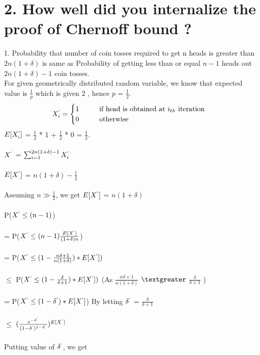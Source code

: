 \documentclass{article}
\begin{document}
\section*{2. How well did you internalize the proof of Chernoff bound ?} 
1. Probability that number of coin tosses required to get n heads is greater than $2n(1 + \delta)$ is same as Probability of getting less than or equal $n-1$ heads out $2n(1 + \delta) - 1$ coin tosses. \\ 
For given geometrically distributed random variable, we know that expected value is $\frac{1}{p}$ which is given $2$ , hence $p$ = $\frac{1}{2}$. \\
\[
	X_i^{`} =\begin{cases}
		1  \hspace{1cm}   $if head is obtained at $i_{th}$ iteration$ \\
		0  \hspace{1cm}   $otherwise$ 
		\end{cases}
\] %
$E[X_i^{`}]$ = $\frac{1}{2}$ * 1 + $\frac{1}{2}$ * 0 = $\frac{1}{2}$. \\\\
$X^{`}$ = $\sum_{i=1}^{2n(1 + \delta) - 1}X_i^{`}$ \\\\
$E[X^{`}]$ = $n(1+\delta) - \frac{1}{2}$ \\\\
Assuming $n \gg \frac{1}{2}$, we get $E[X^{`}]$ =  $n(1+\delta) $ \\\\
P($X^{`} \leq (n-1)$) \\\\
= P($X^{`} \leq (n-1)\frac{E[X^{`}]}{(1 + \delta)n}$)\\\\
= P($X^{`} \leq (1 - \frac{n\delta+1}{n(1+\delta)})*E[X^{`}])$ \\\\
$\leq$ P($X^{`} \leq (1 - \frac{\delta}{\delta + 1})*E[X^{`}])$ (As $\frac{n\delta+1}{n(1+\delta)}$ $\textgreater$ $\frac{\delta}{\delta + 1}$ )\\\\
= P($X^{`} \leq (1 - \delta^{`})*E[X^{`}] $)
By letting $\delta^{`}$ = $\frac{\delta}{\delta + 1}$ \\\\ 
$\leq$ $(\frac{e^{-\delta^{`}}}{(1 - \delta^{`})^{1 - \delta^{`}}})^{E[X^{`}]}$\\\\
Putting value of $\delta^{`}$, we get \\\\ 
\end{document}
